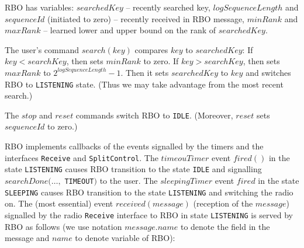 \documentclass{llncs}
\begin{document}
RBO has variables: $searchedKey$ -- recently searched key,
$logSequenceLength$ and $sequenceId$ (initiated to zero) -- recently received in RBO message,
$minRank$ and $maxRank$ -- learned lower and upper bound on the 
rank of $searchedKey$.

The user's command $search(key)$ compares $key$ to $searchedKey$:
If $key<searchKey$, then sets $minRank$ to zero.
If $key>searchKey$, then sets $maxRank$ to $2^{logSequenceLength}-1$.
Then it sets $searchedKey$ to $key$ and switches RBO to \verb|LISTENING| state.
(Thus we may take advantage from the most recent search.)
 
The $stop$ and $reset$ commands switch RBO to \verb|IDLE|.
(Moreover, $reset$ sets $sequenceId$ to zero.)

RBO implements callbacks of the events signalled by the timers and the
interfaces \verb|Receive| and \verb|SplitControl|.
The $timeouTimer$ event $fired()$ in the state \verb|LISTENING|
causes RBO transition to the state \verb|IDLE| and signalling 
$searchDone(\ldots,$ \verb|TIMEOUT|$)$ to the user.
The $sleepingTimer$ event $fired$ in the state \verb|SLEEPING|
causes RBO transition to the state \verb|LISTENING|
and switching the radio on.
The (most essential) event $received( message )$ (reception of the $message$) 
signalled by the radio \verb|Receive|
interface to RBO in state \verb|LISTENING| is served by RBO as follows
(we use notation $message.name$ to denote the field in the message and $name$ to denote variable of RBO): 
\end{document}
